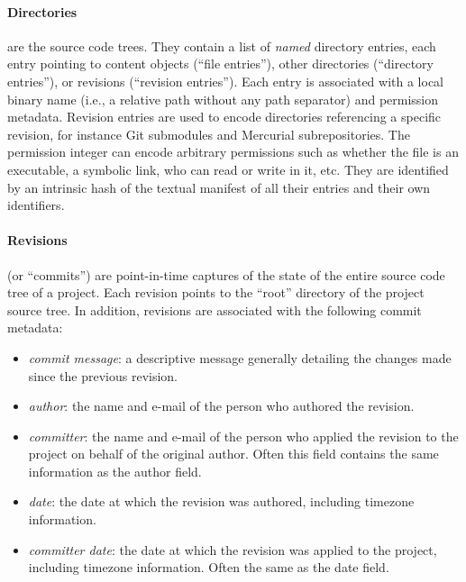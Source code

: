\begin{figure}\centering
{}
\end{figure}
\paragraph{\textbf{Directories}} are the source code trees. They contain a
list of \emph{named} directory entries, each entry pointing to content objects
(``file entries''), other directories (``directory entries''), or revisions
(``revision entries''). Each entry is associated with a local binary name
(i.e., a relative path without any path separator) and permission metadata.
Revision entries are used to encode directories referencing a specific
revision, for instance Git submodules and Mercurial subrepositories.  The
permission integer can encode arbitrary permissions such as whether the file is
an executable, a symbolic link, who can read or write in it, etc.  They are
identified by an intrinsic hash of the textual manifest of all their entries
and their own identifiers.


\begin{figure}\centering
{}
\end{figure}
\paragraph{\textbf{Revisions}} (or ``commits'') are point-in-time captures of
the state of the entire source code tree of a project. Each revision points to
the ``root'' directory of the project source tree. In addition, revisions are
associated with the following commit metadata:

\begin{itemize}
    \setlength\itemsep{0em}
    \item \emph{commit message}: a descriptive message generally detailing the
        changes made since the previous revision.
    \item \emph{author}: the name and e-mail of the person who authored the
        revision.
    \item \emph{committer}: the name and e-mail of the person who applied the
        revision to the project on behalf of the original author. Often this
        field contains the same information as the author field.
    \item \emph{date}: the date at which the revision was authored, including
        timezone information.
    \item \emph{committer date}: the date at which the revision was applied to
        the project, including timezone information. Often the same as the date
        field.
\end{itemize}

